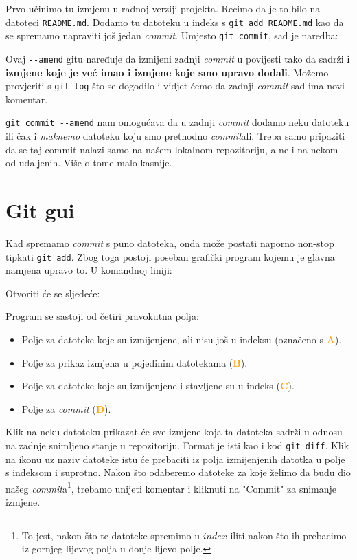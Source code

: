 Prvo učinimo tu izmjenu u radnoj verziji projekta. 
Recimo da je to bilo na datoteci \verb+README.md+.
Dodamo tu datoteku u indeks s \verb+git add README.md+ kao da se spremamo napraviti još jedan \emph{commit}.
Umjesto \verb+git commit+, sad je naredba:


Ovaj \verb+--amend+ gitu naređuje da izmijeni zadnji \emph{commit} u povijesti tako da sadrži \textbf{i izmjene koje je već imao i izmjene koje smo upravo dodali}.
Možemo provjeriti s \verb+git log+ što se dogodilo i vidjet ćemo da zadnji \emph{commit} sad ima novi komentar.

\verb+git commit --amend+ nam omogućava da u zadnji \emph{commit} dodamo neku datoteku ili čak i \emph{maknemo} datoteku koju smo prethodno \emph{commit}ali. 
Treba samo pripaziti da se taj commit nalazi samo na našem lokalnom repozitoriju, a ne i na nekom od udaljenih. 
Više o tome malo kasnije.

\section*{Git gui}

Kad spremamo \emph{commit} s puno datoteka, onda može postati naporno non-stop tipkati \verb+git add+.
Zbog toga postoji poseban grafički program kojemu je glavna namjena upravo to.
U komandnoj liniji:


Otvoriti će se sljedeće:


Program se sastoji od četiri pravokutna polja:

\begin{itemize}
	\item Polje za datoteke koje su izmijenjene, ali nisu još u indeksu (označeno s \textcolor{orange}{\textbf{A}}).
	\item Polje za prikaz izmjena u pojedinim datotekama (\textcolor{orange}{\textbf{B}}). 
	\item Polje za datoteke koje su izmijenjene i stavljene su u indeks (\textcolor{orange}{\textbf{C}}).
	\item Polje za \emph{commit} (\textcolor{orange}{\textbf{D}}).
\end{itemize}

Klik na neku datoteku prikazat će sve izmjene koja ta datoteka sadrži u odnosu na zadnje snimljeno stanje u repozitoriju.
Format je isti kao i kod \verb+git diff+.
Klik na ikonu uz naziv datoteke istu će prebaciti iz polja izmijenjenih datotka u polje s indeksom i suprotno.
Nakon što odaberemo datoteke za koje želimo da budu dio našeg \emph{commit}a\footnote{To jest, nakon što te datoteke spremimo u $index$ iliti nakon što ih prebacimo iz gornjeg lijevog polja u donje lijevo polje.}, trebamo unijeti komentar i kliknuti na "Commit" za snimanje izmjene.

